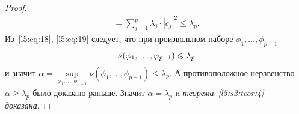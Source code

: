 \begin{proof}
\begin{multline}
		=\sum\limits_{j=1}^{p}\lambda_j\cdot|c_j|^2\leqslant\lambda_p.
	\end{multline}
	Из~\eqref{l5:eq:18}, \eqref{l5:eq:19} следует, что при произвольном наборе $\phi_1,\ldots,\phi_{p-1}$
	\begin{equation*}
		\hfill\nu(\phi_1,\ldots,\phi_{p-1})\leqslant\lambda_p\hfill
	\end{equation*}
	и значит $\alpha=\sup\limits_{\phi_1,\ldots,\phi_{p-1}}\nu(\phi_1,\ldots,\phi_{p-1})\leqslant\lambda_p$. А противоположное неравенство $\alpha\geqslant\lambda_p$ было доказано раньше. Значит $\alpha=\lambda_p$ и \emph{теорема~\ref{l5:s2:teor:4} доказана}.
\end{proof}